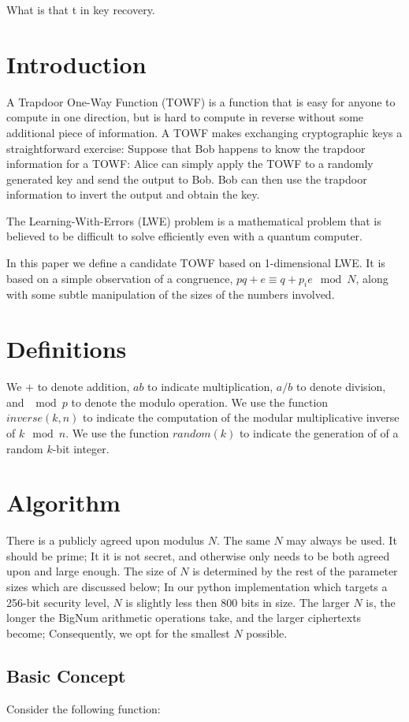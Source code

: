\documentclass[preprint]{iacrtrans}
\begin{document}
What is that t in key recovery.

\section{Introduction}
A Trapdoor One-Way Function (TOWF) is a function that is easy for anyone to compute in one direction, but is hard to compute in reverse without some additional piece of information. A TOWF makes exchanging cryptographic keys a straightforward exercise: Suppose that Bob happens to know the trapdoor information for a TOWF: Alice can simply apply the TOWF to a randomly generated key and send the output to Bob. Bob can then use the trapdoor information to invert the output and obtain the key.  

The Learning-With-Errors (LWE) problem is a mathematical problem that is believed to be difficult to solve efficiently even with a quantum computer. 

In this paper we define a candidate TOWF based on 1-dimensional LWE. It is based on a simple observation of a congruence, $pq + e \equiv q + p_i e \mod N$, along with some subtle manipulation of the sizes of the numbers involved.

\section{Definitions}
We $+$ to denote addition, $a b$ to indicate multiplication, $a / b$ to denote division, and $\mod p$ to denote the modulo operation. We use the function $inverse(k, n)$ to indicate the computation of the modular multiplicative inverse of $k \mod n$. We use the function $random(k)$ to indicate the generation of of a random $k$-bit integer.

\section{Algorithm}
There is a publicly agreed upon modulus $N$. The same $N$ may always be used. It should be prime; It it is not secret, and otherwise only needs to be both agreed upon and large enough. The size of $N$ is determined by the rest of the parameter sizes which are discussed below; In our python implementation which targets a 256-bit security level, $N$ is slightly less then 800 bits in size. The larger $N$ is, the longer the BigNum arithmetic operations take, and the larger ciphertexts become; Consequently, we opt for the smallest $N$ possible.

\subsection{Basic Concept}
Consider the following function:
\end{document}

